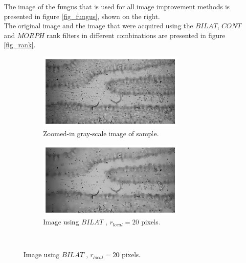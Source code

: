 The image of the fungus that is used for all image improvement methods is presented in figure \ref{fig_fungus}, shown on the right.\\
The original image and the image that were acquired using the $BILAT$, $CONT$ and $MORPH$ rank filters in different combinations are presented in figure \ref{fig_rank}.\\

\begin{figure}[h!]
    \begin{subfigure}[b]{0.5\textwidth}
        \centering
        \includegraphics[width=0.8\textwidth, frame]{afbeeldingen/rank/img.png}
        \caption{Zoomed-in gray-scale image of sample.}
        \label{fig_rank_plain}
    \end{subfigure}
    \begin{subfigure}[b]{0.5\textwidth}
        \centering
        \includegraphics[width=0.8\textwidth, frame]{afbeeldingen/rank/img_bilat.png}
        \caption{Image using $BILAT$ , $r_{local}=20$ pixels.}
        \label{fig_rank_bilat}
    \end{subfigure}
\\


\end{figure}
